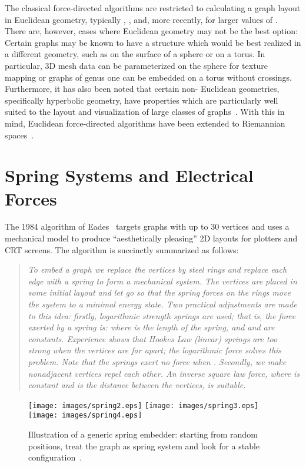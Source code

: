 \documentclass[notitlepage,letter,11pt]{article}
\begin{document}
The classical force-directed algorithms are restricted to calculating
a graph layout in Euclidean geometry, typically ,
, and, more recently,  for larger values of
. There are, however, cases where Euclidean geometry may not be the
best option: Certain graphs may be known to have a structure which
would be best realized in a different geometry, such as on the surface
of a sphere or on a torus. In particular, 3D mesh data can be
parameterized on the sphere for texture mapping or graphs of genus one
can be embedded on a torus without crossings.  Furthermore, it has
also been noted that certain non- Euclidean geometries, specifically
hyperbolic geometry, have properties which are particularly well
suited to the layout and visualization of large classes of
graphs~\cite{EVL-1995-206,Munzner+1997a}. With this in mind, Euclidean force-directed algorithms have been extended to Riemannian spaces~\cite{kw-nese-05}.






\section{Spring Systems and Electrical Forces}
\label{fd:sec:fr}


The 1984 algorithm of Eades~\cite{Eades+1984a} targets graphs with up
to 30 vertices and uses a mechanical model to produce ``aesthetically
pleasing'' 2D layouts for plotters and CRT screens. The algorithm is
succinctly summarized as follows:

\begin{quote}
{\em To embed a graph we replace the vertices by steel rings and
replace each edge with a spring to form a mechanical system. The
vertices are placed in some initial layout and let go so that the
spring forces on the rings move the system to a minimal energy
state. Two practical adjustments are made to this idea: firstly,
logarithmic strength springs are used; that is, the force exerted by a
spring is:  where  is the length of the
spring, and  and  are constants. Experience shows that
Hookes Law (linear) springs are too strong when the vertices are far
apart; the logarithmic force solves this problem. Note that the springs
exert no force when . Secondly, we make nonadjacent vertices
repel each other. An inverse square law force,  where
 is constant and  is the distance between the vertices, is
suitable.}
\end{quote}


\begin{figure}[t]
\begin{center}
\texttt{[image: images/spring2.eps]}
\texttt{[image: images/spring3.eps]}
\texttt{[image: images/spring4.eps]}
\end{center}
\caption{\small\sf Illustration of a generic spring embedder: starting from random positions, treat the graph as spring system and look for a stable configuration~\cite{gk-grip-00}.
}
\label{fd:fig:spring}
\end{figure}
\end{document}

